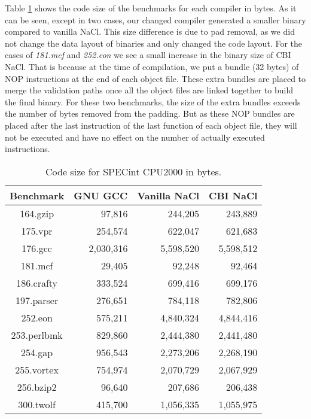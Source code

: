 \documentclass[conference]{IEEEtran}
\begin{document}



Table \ref{tab:filesize} shows the code size of the benchmarks for each compiler in bytes. As it can be seen, except in two cases, our changed compiler generated a smaller binary compared to vanilla NaCl. This size difference is due to pad removal, as we did not change the  data layout of binaries and only changed the code layout. For the cases of \textit{181.mcf} and \textit{252.eon} we see a small increase in the binary size of CBI NaCl. That is because at the time of compilation, we put a bundle (32 bytes) of NOP instructions at the end of each object file. These extra bundles are placed to merge the validation paths once all the object files are linked together to build the final binary. For these two benchmarks, the size of the extra bundles exceeds the number of bytes removed from the padding. But as these NOP bundles are placed after the last instruction of the last function of each object file, they will not be executed and have no effect on the number of actually executed instructions.



\begin{table}
\centering
\caption{Code size for SPECint CPU2000 in bytes.}
\label{tab:filesize}
\begin{tabular}{|c||r|r|r|} \hline


\textbf{Benchmark}&\textbf{GNU GCC}&\textbf{Vanilla NaCl}&\textbf{CBI NaCl} \\ \hline \hline
   
164.gzip&97,816&244,205&243,889\\ \hline  
175.vpr&254,574&622,047&621,683\\ \hline  
176.gcc&2,030,316&5,598,520&5,598,512\\ \hline 
181.mcf&29,405&92,248&92,464\\ \hline
186.crafty&333,524&699,416&699,176\\ \hline  
197.parser&276,651&784,118&782,806\\ \hline  
252.eon&575,211&4,840,324&4,844,416\\ \hline 
253.perlbmk&829,860&2,444,380&2,441,480\\ \hline 
254.gap&956,543&2,273,206&2,268,190\\ \hline 
255.vortex&754,974&2,070,729&2,067,929\\ \hline 
256.bzip2&96,640&207,686&206,438\\ \hline  
300.twolf&415,700&1,056,335&1,055,975\\ \hline
\end{tabular}
\end{table}
\end{document}
